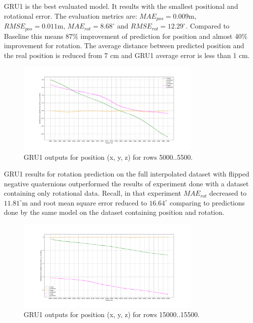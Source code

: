 GRU1 is the best evaluated model. It results with the smallest positional and rotational error. The evaluation metrics are: $MAE_{pos} = 0.009$m, $RMSE_{pos} = 0.011$m, $MAE_{rot} = 8.68^{\circ}$ and $RMSE_{rot} =12.29^{\circ}$. Compared to Baseline this means 87\% improvement of prediction for position and almost 40\% improvement for rotation. The average distance between predicted position and the real position is reduced from 7 cm and GRU1 average error is less than 1 cm.
\begin{figure}[b!]
	\begin{center}
		\includegraphics[width=0.8\textwidth, keepaspectratio]{gfx/gru1-xyz_position.pdf}
		\caption{GRU1 outputs for position (x, y, z) for rows 5000..5500.}
		\label{fig:gru1-1}
	\end{center}
\end{figure}

GRU1 results for rotation prediction on the full interpolated dataset with flipped negative quaternions outperformed the results of experiment done with a dataset containing only rotational data. Recall, in that experiment $MAE_{rot}$ decreased to $11.81^{\circ}$m and root mean square error reduced to $16.64^{\circ}$ comparing to predictions done by the same model on the dataset containing position and rotation.
\begin{figure}[t!]
	\begin{center}
		\includegraphics[width=0.8\textwidth]{gfx/gru1-xyz_position_15000.pdf}
		\caption{GRU1 outputs for position (x, y, z) for rows 15000..15500.}
		\label{fig:gru1-2}
	\end{center}
\end{figure}


